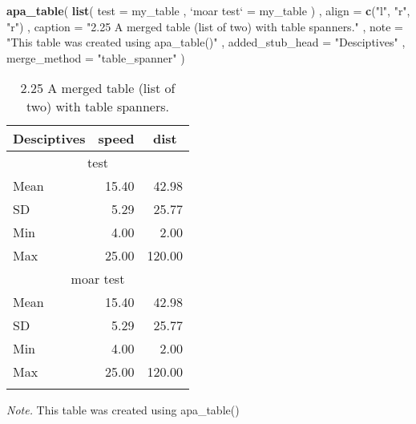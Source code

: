 \documentclass[english,man]{apa6}
\newenvironment{Shaded}{\begin{snugshade}}{\end{snugshade}}
\newcommand{\DataTypeTok}[1]{\textcolor[rgb]{0.13,0.29,0.53}{#1}}
\newcommand{\KeywordTok}[1]{\textcolor[rgb]{0.13,0.29,0.53}{\textbf{#1}}}
\newcommand{\NormalTok}[1]{#1}
\newcommand{\StringTok}[1]{\textcolor[rgb]{0.31,0.60,0.02}{#1}}
\begin{document}
\begin{Shaded}
\begin{Highlighting}[]
\KeywordTok{apa_table}\NormalTok{(}
  \KeywordTok{list}\NormalTok{(}
    \DataTypeTok{test =}\NormalTok{ my_table}
\NormalTok{    , }\StringTok{`}\DataTypeTok{moar test}\StringTok{`}\NormalTok{ =}\StringTok{ }\NormalTok{my_table}
\NormalTok{  )}
\NormalTok{  , }\DataTypeTok{align =} \KeywordTok{c}\NormalTok{(}\StringTok{"l"}\NormalTok{, }\StringTok{"r"}\NormalTok{, }\StringTok{"r"}\NormalTok{)}
\NormalTok{  , }\DataTypeTok{caption =} \StringTok{"2.25 A merged table (list of two) with table spanners."}
\NormalTok{  , }\DataTypeTok{note =} \StringTok{"This table was created using apa_table()"}
\NormalTok{  , }\DataTypeTok{added_stub_head =} \StringTok{"Desciptives"}
\NormalTok{  , }\DataTypeTok{merge_method =} \StringTok{"table_spanner"}
\NormalTok{)}
\end{Highlighting}
\end{Shaded}

\begin{table}[tbp]

\begin{center}
\begin{threeparttable}

\caption{\label{tab:unnamed-chunk-5}2.25 A merged table (list of two) with table spanners.}

\begin{tabular}{lrr}
\toprule
Desciptives & \multicolumn{1}{c}{speed} & \multicolumn{1}{c}{dist}\\
\midrule
\multicolumn{3}{c}{test}\\
Mean & 15.40 & 42.98\\
SD & 5.29 & 25.77\\
Min & 4.00 & 2.00\\
Max & 25.00 & 120.00\\
\multicolumn{3}{c}{moar test}\\
Mean & 15.40 & 42.98\\
SD & 5.29 & 25.77\\
Min & 4.00 & 2.00\\
Max & 25.00 & 120.00\\
\bottomrule
\addlinespace
\end{tabular}

\begin{tablenotes}[para]
\normalsize{\textit{Note.} This table was created using apa\_table()}
\end{tablenotes}

\end{threeparttable}
\end{center}

\end{table}
\end{document}
